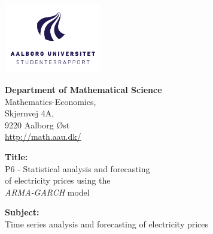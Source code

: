 
\begin{titlepage}
\thispagestyle{empty}
{}

\begin{minipage}[t]{0.48\textwidth}
\vspace*{-25pt}			%
\includegraphics[height=3cm]{Formalities/Intro/AAUlogo.pdf}
\end{minipage}
\hfill
\begin{minipage}[t]{0.48\textwidth}
{\small 
\textbf{Department of Mathematical Science}\\
Mathematics-Economics,\\
Skjernvej 4A,\\ 9220 Aalborg Øst \\ \hyperlink{http://math.aau.dk/}{http://math.aau.dk/}
}
\end{minipage}



\vspace*{1cm}

\begin{minipage}[t]{0.48\textwidth}
\textbf{Title:} \\[5pt]\hspace*{2ex}
\hspace*{-13pt}P6 - Statistical analysis and forecasting \\ of
electricity prices using the \\ \textit{ARMA-GARCH} model\\\hspace*{2ex}

\textbf{Subject:} \\[5pt]\hspace*{2ex}
\hspace*{-13pt}Time series analysis and forecasting of electricity prices\\\hspace*{2ex}
 

\end{minipage}
\end{titlepage}
